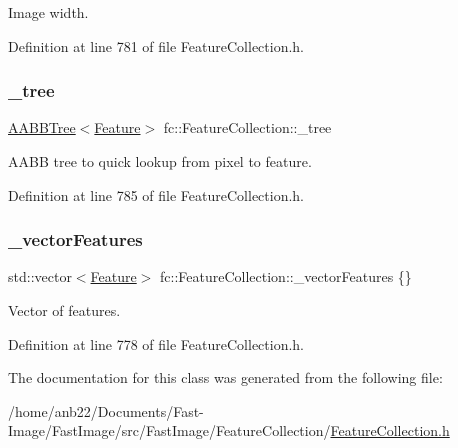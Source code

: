 Image width. 



Definition at line 781 of file Feature\+Collection.\+h.

\mbox{\label{classfc_1_1FeatureCollection_aefe7fa7516a8968d16b299a38e082281}} 
\subsubsection{\texorpdfstring{\+\_\+tree}{\_tree}}
{\footnotesize\ttfamily \hyperlink{classfc_1_1AABBTree}{A\+A\+B\+B\+Tree}$<$\hyperlink{classfc_1_1Feature}{Feature}$>$ fc\+::\+Feature\+Collection\+::\+\_\+tree\hspace{0.3cm}{\ttfamily [private]}}



A\+A\+BB tree to quick lookup from pixel to feature. 



Definition at line 785 of file Feature\+Collection.\+h.

\mbox{\label{classfc_1_1FeatureCollection_add1b0fdcaa47ee9ed4419ed201a33a10}} 
\subsubsection{\texorpdfstring{\+\_\+vector\+Features}{\_vectorFeatures}}
{\footnotesize\ttfamily std\+::vector$<$\hyperlink{classfc_1_1Feature}{Feature}$>$ fc\+::\+Feature\+Collection\+::\+\_\+vector\+Features \{\}\hspace{0.3cm}{\ttfamily [private]}}



Vector of features. 



Definition at line 778 of file Feature\+Collection.\+h.



The documentation for this class was generated from the following file\+:\begin{DoxyCompactItemize}
\item 
/home/anb22/\+Documents/\+Fast-\/\+Image/\+Fast\+Image/src/\+Fast\+Image/\+Feature\+Collection/\hyperlink{FeatureCollection_8h}{Feature\+Collection.\+h}\end{DoxyCompactItemize}
